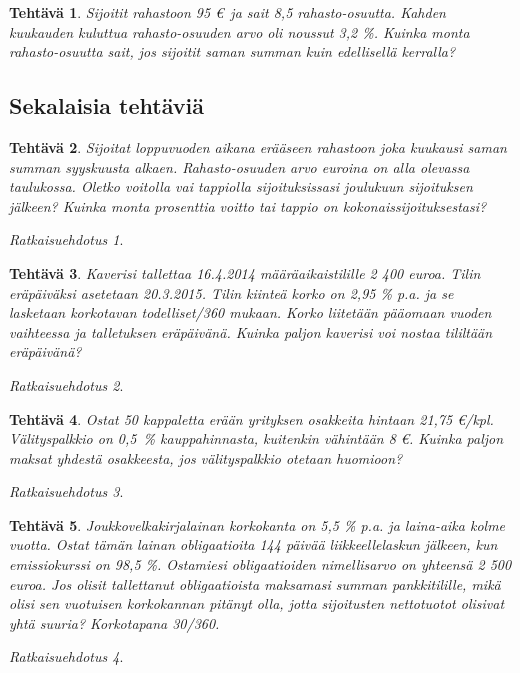 \documentclass{article}\usepackage[]{graphicx}\usepackage[]{color}
\newtheorem{teht}{Tehtävä}
\theoremstyle{remark}
\newtheorem*{ratk}{Ratkaisuehdotus}
\begin{document}
\begin{teht} Sijoitit rahastoon 95 \euro \  ja sait 8{,}5 rahasto-osuutta. Kahden kuukauden kuluttua rahasto-osuuden arvo oli noussut 3{,}2 \%. Kuinka monta rahasto-osuutta sait, jos sijoitit saman summan kuin edellisellä kerralla?

\end{teht}

\subsection*{Sekalaisia tehtäviä}

\begin{teht} Sijoitat loppuvuoden aikana erääseen rahastoon joka kuukausi saman summan syyskuusta alkaen. Rahasto-osuuden arvo euroina on alla olevassa taulukossa. Oletko voitolla vai tappiolla sijoituksissasi joulukuun sijoituksen jälkeen? Kuinka monta prosenttia voitto tai tappio on kokonaissijoituksestasi?
\end{teht}\begin{ratk}\end{ratk}

\begin{teht} Kaverisi tallettaa 16.4.2014 määräaikaistilille 2 400 euroa. Tilin eräpäiväksi asetetaan 20.3.2015. Tilin kiinteä korko on 2{,}95 \% p.a. ja se lasketaan korkotavan todelliset/360 mukaan. Korko liitetään pääomaan vuoden vaihteessa ja talletuksen eräpäivänä. Kuinka paljon kaverisi voi nostaa tililtään eräpäivänä?

\end{teht}\begin{ratk}\end{ratk}

\begin{teht} Ostat 50 kappaletta erään yrityksen osakkeita hintaan 21{,}75 \euro/kpl. Välityspalkkio on 0{,}5~\% kauppahinnasta, kuitenkin vähintään 8 \euro. Kuinka paljon maksat yhdestä osakkeesta, jos välityspalkkio otetaan huomioon?

\end{teht}

\begin{ratk}\end{ratk}\begin{teht} Joukkovelkakirjalainan korkokanta on 5{,}5 \% p.a. ja laina-aika kolme vuotta. Ostat tämän lainan obligaatioita 144 päivää liikkeellelaskun jälkeen, kun emissiokurssi on 98{,}5 \%. Ostamiesi obligaatioiden nimellisarvo on yhteensä 2 500 euroa. Jos olisit tallettanut obligaatioista maksamasi summan pankkitilille, mikä olisi sen vuotuisen korkokannan pitänyt olla, jotta sijoitusten nettotuotot olisivat yhtä suuria? Korkotapana 30/360.

\end{teht}\begin{ratk}\end{ratk}
\end{document}
